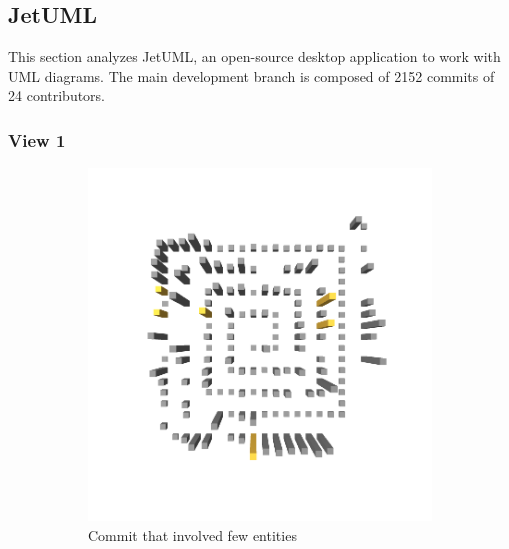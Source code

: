 \subsection{JetUML}
This section analyzes JetUML, an open-source desktop application to work with UML diagrams.
The main development branch is composed of 2152 commits of 24 contributors. 

\subsubsection{View 1}
\begin{figure}[t!]
    \begin{subfigure}{0.42\textwidth}
        \includegraphics[width=\linewidth]{JetUML_V0E0.png}
        \caption{Commit that involved few entities} \label{fig:JetUML_V0E0}
    \end{subfigure}
    \hspace*{\fill}
    \begin{subfigure}{0.42\textwidth}

\end{subfigure}
\end{figure}

